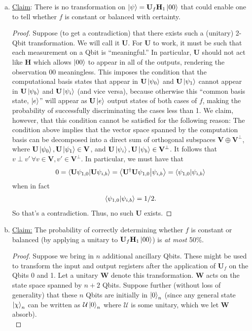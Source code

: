 \documentclass{book}
\theoremstyle{definition}
\newcommand{\V}{\mathbf{V}}
\newcommand{\had}{\mathbf{H}}
\begin{document}
\begin{enumerate}[(a)]
	
	
	\item \underline{Claim}: There is no transformation on $\ket{\psi} =  \mathbf{U}_f\had_1\ket{00}$ that could enable one to tell whether $f$ is constant or balanced with certainty. 
	
	\begin{proof}
		Suppose (to get a contradiction) that there exists such a (unitary) 2-Qbit transformation. We will call it $\mathbf{U}$. For $\mathbf{U}$ to work, it must be such that each measurement on a Qbit is ``meaningful.'' In particular, $\mathbf{U}$ should not act like $\had$ which allows $\ket{00}$ to appear in all of the outputs, rendering the observation $00$ meaningless. This imposes the condition that the computational basis states that appear in $\mathbf{U}\ket{\psi_0}$ and $\mathbf{U}\ket{\psi_1}$ cannot appear in $\mathbf{U}\ket{\psi_b}$ and $\mathbf{U}\ket{\psi_i}$ (and vice versa), because otherwise this ``common basis state, $\ket{e}$'' will appear as $\mathbf{U}\ket{e}$ output states of both cases of $f$, making the probability of successfully discriminating the cases less than 1. We claim, however, that this condition cannot be satisfied for the following reason: The condition above implies that the vector space spanned by the computation basis can be decomposed into a direct sum of orthogonal subspaces $\V \oplus \V^\perp$, where $\mathbf{U}\ket{\psi_0}, \mathbf{U}\ket{\psi_1} \in \V$, and $\mathbf{U}\ket{\psi_i}, \mathbf{U}\ket{\psi_b}\in \V^\perp$. It follows that $v\perp v'\,\forall v\in \V, v'\in \V^\perp$. In particular, we must have that
		\begin{align}
		0=\braket{\mathbf{U}\psi_{1,0}}{\mathbf{U}\psi_{i,b}} = \braket{\mathbf{U}^\dagger\mathbf{U}\psi_{1,0}}{\psi_{i,b}} = \braket{\psi_{1,0}}{\psi_{i,b}}
		\end{align}  
		when in fact
		\begin{align}
		\braket{\psi_{1,0}}{\psi_{i,b}} = 1/2.
		\end{align}
		So that's a contradiction. Thus, no such $\mathbf{U}$ exists.
	\end{proof}
	
	
	
	
	\item \underline{Claim:} The probability of correctly determining whether $f$ is constant or balanced (by applying a unitary to $\mathbf{U}_f\had_1\ket{00}$) is \textit{at most} 50\%.
	\begin{proof}
		Suppose we bring in $n$ additional ancillary Qbits. These might be used to transform the input and output registers after the application of $\mathbf{U}_f$ on the Qbits 0 and 1. Let a unitary $\mathbf{W}$ denote this transformation. $\mathbf{W}$ acts on the state space spanned by $n+2$ Qbits. Suppose further (without loss of generality) that these $n$ Qbits are initially in $\ket{0}_n$ (since any general state $\ket{\chi}_n$ can be written as $\mathbf{\mathcal{U}}\ket{0}_n$ where $\mathcal{U}$ is some unitary, which we let $\mathbf{W}$ absorb). \\
		

\end{proof}
\end{enumerate}
\end{document}
